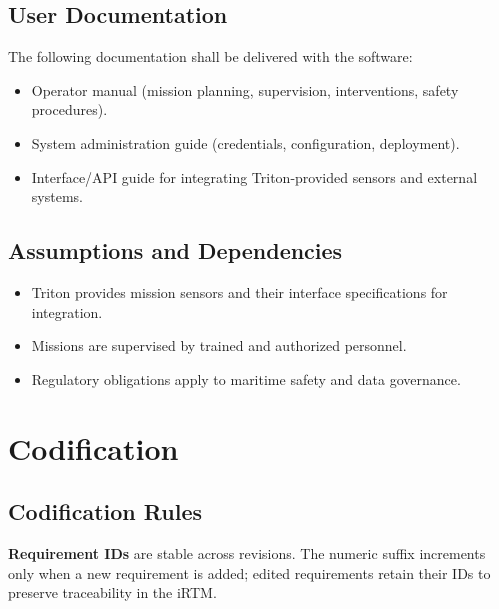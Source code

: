 \documentclass[11pt,a4paper]{article}
\begin{document}
\subsection{User Documentation}
The following documentation shall be delivered with the software:
\begin{itemize}[leftmargin=*,nosep]
  \item Operator manual (mission planning, supervision, interventions, safety procedures).
  \item System administration guide (credentials, configuration, deployment).
  \item Interface/API guide for integrating Triton-provided sensors and external systems.
\end{itemize}

\subsection{Assumptions and Dependencies}
\begin{itemize}[leftmargin=*,nosep]
  \item Triton provides mission sensors and their interface specifications for integration.
  \item Missions are supervised by trained and authorized personnel.
  \item Regulatory obligations apply to maritime safety and data governance.
\end{itemize}

\section{Codification}
\label{sec:codification}

\subsection{Codification Rules}
\textbf{Requirement IDs} are stable across revisions. The numeric suffix increments only when a new requirement is added; edited requirements retain their IDs to preserve traceability in the iRTM.
\end{document}
